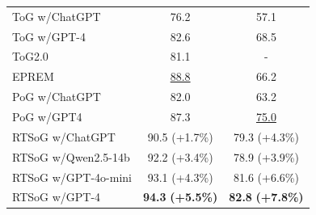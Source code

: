 \documentclass[lettersize,journal]{IEEEtran}
\begin{document}
\begin{table}[h]
\begin{tabular}{ccc}
\multicolumn{1}{l}{ToG w/ChatGPT}            & 76.2      & 57.1    \\
\multicolumn{1}{l}{ToG w/GPT-4}            & 82.6      & 68.5    \\
\multicolumn{1}{l}{ToG2.0}                 & 81.1      & -       \\
\multicolumn{1}{l}{EPREM}            & \underline{88.8}      & 66.2    \\
\multicolumn{1}{l}{PoG w/ChatGPT}            & 82.0      & 63.2    \\
\multicolumn{1}{l}{PoG w/GPT4}             &  87.3      & \underline{75.0}    \\ \midrule
\multicolumn{1}{l}{RTSoG w/ChatGPT}         &90.5 (+1.7\%)          &79.3 (+4.3\%)        \\
\multicolumn{1}{l}{RTSoG w/Qwen2.5-14b}     &92.2 (+3.4\%)         &78.9 (+3.9\%)        \\
\multicolumn{1}{l}{RTSoG w/GPT-4o-mini}     &93.1 (+4.3\%)          & 81.6 (+6.6\%)       \\
\multicolumn{1}{l}{RTSoG w/GPT-4}           &\textbf{94.3} \textbf{(+5.5\%)}           & \textbf{82.8} \textbf{(+7.8\%)}       \\ \bottomrule
\end{tabular}
\label{tab2}
\end{table}
\end{document}
